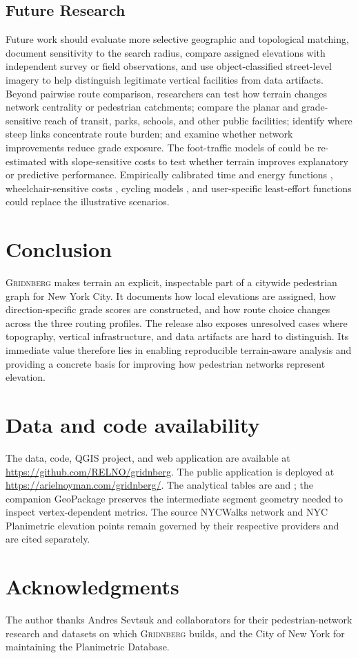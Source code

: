\documentclass[twocolumn,10pt]{article}
\newcommand{\dataset}{\textsc{Gridnberg}\xspace}
\begin{document}
\subsection{Future Research}

Future work should evaluate more selective geographic and topological matching, document sensitivity to the search radius, compare assigned elevations with independent survey or field observations, and use object-classified street-level imagery to help distinguish legitimate vertical facilities from data artifacts.
\\
Beyond pairwise route comparison, researchers can test how terrain changes network centrality or pedestrian catchments; compare the planar and grade-sensitive reach of transit, parks, schools, and other public facilities; identify where steep links concentrate route burden; and examine whether network improvements reduce grade exposure. The foot-traffic models of \citet{sevtsuk2026spatial} could be re-estimated with slope-sensitive costs to test whether terrain improves explanatory or predictive performance. Empirically calibrated time and energy functions \citep{paez2020comparing,greenberg2020physical}, wheelchair-sensitive costs \citep{hosseini2024inclusive}, cycling models \citep{nourian2015easiest}, and user-specific least-effort functions \citep{ng2024beyond} could replace the illustrative scenarios.

\section{Conclusion}

\dataset makes terrain an explicit, inspectable part of a citywide pedestrian graph for New York City. It documents how local elevations are assigned, how direction-specific grade scores are constructed, and how route choice changes across the three routing profiles. The release also exposes unresolved cases where topography, vertical infrastructure, and data artifacts are hard to distinguish. Its immediate value therefore lies in enabling reproducible terrain-aware analysis and providing a concrete basis for improving how pedestrian networks represent elevation.

\section*{Data and code availability}

The data, code, QGIS project, and web application are available at \url{https://github.com/RELNO/gridnberg}. The public application is deployed at \url{https://arielnoyman.com/gridnberg/}. The analytical tables are  and ; the companion GeoPackage preserves the intermediate segment geometry needed to inspect vertex-dependent metrics. The source NYCWalks network and NYC Planimetric elevation points remain governed by their respective providers and are cited separately.


\section*{Acknowledgments}

The author thanks Andres Sevtsuk and collaborators for their pedestrian-network research and datasets on which \dataset builds, and the City of New York for maintaining the Planimetric Database.

\balance
\printbibliography
\end{document}
